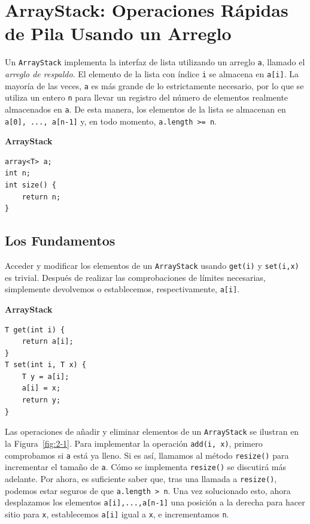 \documentclass[11pt]{book}
\theoremstyle{plain}
\newcommand{\claseheader}[1]{\noindent\textbf{#1}\par\vspace{-4pt}}
\begin{document}
\section{ArrayStack: Operaciones Rápidas de Pila Usando un Arreglo}
\label{sec:arraystack}

Un \texttt{ArrayStack} implementa la interfaz de lista utilizando un arreglo \texttt{a}, llamado el \emph{arreglo de respaldo}. El elemento de la lista con índice \texttt{i} se almacena en \texttt{a[i]}. La mayoría de las veces, \texttt{a} es más grande de lo estrictamente necesario, por lo que se utiliza un entero \texttt{n} para llevar un registro del número de elementos realmente almacenados en \texttt{a}. De esta manera, los elementos de la lista se almacenan en \texttt{a[0], ..., a[n-1]} y, en todo momento, \texttt{a.length >= n}.

\claseheader{ArrayStack}
\begin{lstlisting}
array<T> a;
int n;
int size() {
    return n;
}
\end{lstlisting}

\subsection{Los Fundamentos}

Acceder y modificar los elementos de un \texttt{ArrayStack} usando \texttt{get(i)} y \texttt{set(i,x)} es trivial. Después de realizar las comprobaciones de límites necesarias, simplemente devolvemos o establecemos, respectivamente, \texttt{a[i]}.

\claseheader{ArrayStack}
\begin{lstlisting}
T get(int i) {
    return a[i];
}
T set(int i, T x) {
    T y = a[i];
    a[i] = x;
    return y;
}
\end{lstlisting}

Las operaciones de añadir y eliminar elementos de un \texttt{ArrayStack} se ilustran en la Figura~\ref{fig:2-1}. Para implementar la operación \texttt{add(i, x)}, primero comprobamos si \texttt{a} está ya lleno. Si es así, llamamos al método \texttt{resize()} para incrementar el tamaño de \texttt{a}. Cómo se implementa \texttt{resize()} se discutirá más adelante. Por ahora, es suficiente saber que, tras una llamada a \texttt{resize()}, podemos estar seguros de que \texttt{a.length > n}. Una vez solucionado esto, ahora desplazamos los elementos \texttt{a[i],...,a[n-1]} una posición a la derecha para hacer sitio para \texttt{x}, establecemos \texttt{a[i]} igual a \texttt{x}, e incrementamos \texttt{n}.
\end{document}
